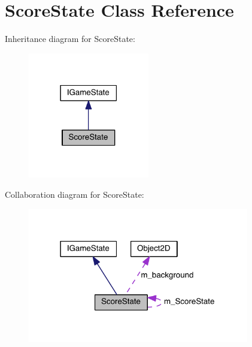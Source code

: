 \hypertarget{class_score_state}{}\section{Score\+State Class Reference}
\label{class_score_state}


Inheritance diagram for Score\+State\+:\nopagebreak
\begin{figure}[H]
\begin{center}
\leavevmode
\includegraphics[width=150pt]{class_score_state__inherit__graph}
\end{center}
\end{figure}


Collaboration diagram for Score\+State\+:\nopagebreak
\begin{figure}[H]
\begin{center}
\leavevmode
\includegraphics[width=274pt]{class_score_state__coll__graph}
\end{center}
\end{figure}
